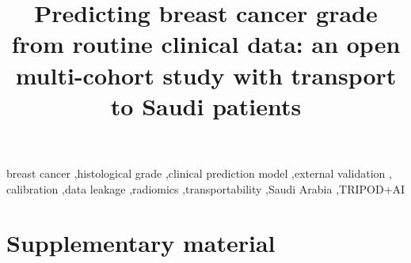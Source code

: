 \documentclass[preprint,12pt,a4paper]{elsarticle}
\newif\ifanon
\begin{document}
\ifanon\linenumbers\fi

\begin{frontmatter}
\title{Predicting breast cancer grade from routine clinical data: an open multi-cohort study with transport to Saudi patients}

\ifanon
\author{[Author details removed for double-anonymised review]}
\else
{}
\fi



\begin{keyword}
breast cancer \sep histological grade \sep clinical prediction model \sep external validation \sep
calibration \sep data leakage \sep radiomics \sep transportability \sep Saudi Arabia \sep TRIPOD+AI
\end{keyword}
\end{frontmatter}










\clearpage
\appendix
\renewcommand{\thetable}{S\arabic{table}}
\renewcommand{\thefigure}{S\arabic{figure}}
\setcounter{table}{0}\setcounter{figure}{0}
\section*{Supplementary material}

\end{document}
